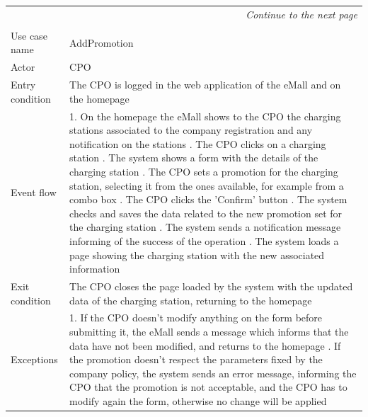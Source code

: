 \begin{center}
    \begin{longtable}{p{4cm} p{11cm}}
    \multicolumn{2}{r}{\itshape{Continue to the next page}}\\
    \endfoot 
    \\
    \endlastfoot
    \hline
     Use case name &  AddPromotion\\
     \hline
     Actor & CPO \\
     \hline
     Entry condition & The CPO is logged in the web application of the eMall and on the homepage \\
     \hline
     Event flow &   1. On the homepage the eMall shows to the CPO the charging stations associated                 to the company registration and any notification on the stations \newline
                    2. The CPO clicks on a charging station \newline 
                    3. The system shows a form with the details of the charging station \newline
                    4. The CPO sets a promotion for the charging station, selecting it from the ones available, for example from a combo box \newline
                    5. The CPO clicks the 'Confirm' button \newline
                    6. The system checks and saves the data related to the new promotion set for the charging station \newline
                    7. The system sends a notification message informing of the success of the operation \newline
                    8. The system loads a page showing the charging station with the new associated information\\
     \hline
     Exit condition &  The CPO closes the page loaded by the system with the updated data of the charging station, returning to the homepage \\
     \hline
     Exceptions &   1. If the CPO doesn't modify anything on the form before submitting it, the                     eMall sends a message which informs that the data have not been modified, and                  returns to the homepage \newline
                    2. If the promotion doesn't respect the parameters fixed by the company policy, the system sends an error message, informing the CPO that the promotion is not acceptable, and the CPO has to modify again the form, otherwise no change will be applied \newline

\end{longtable}
\end{center}
